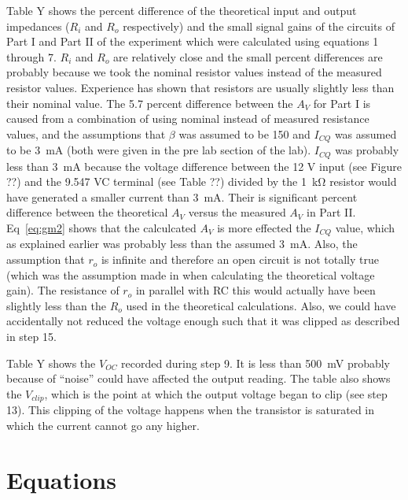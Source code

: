 Table Y shows the percent difference of the theoretical input and output impedances ($R_i$ and $R_o$ respectively) and the small signal gains of the circuits of Part I and Part II of the experiment which were calculated using equations 1 through 7. $R_i$ and $R_o$ are relatively close and the small percent differences are probably because we took the nominal resistor values instead of the measured resistor values. Experience has shown that resistors are usually slightly less than their nominal value. The 5.7 percent difference between the $A_V$ for Part I is caused from a combination of using nominal instead of measured resistance values, and the assumptions that $\beta$ was assumed to be 150 and  $I_{CQ}$ was assumed to be \SI{3}{mA} (both were given in the pre lab section of the lab). $I_{CQ}$ was probably less than \SI{3}{mA} because the voltage difference between the 12 V input (see Figure ??) and the 9.547 VC terminal (see Table ??) divided by the \SI{1}{\kilo\ohm} resistor would have generated a smaller current than \SI{3}{mA}. Their is significant percent difference between the theoretical $A_V$ versus the measured $A_V$ in Part II. Eq~\ref{eq:gm2} shows that the calculcated $A_V$ is more effected the $I_{CQ}$ value, which as explained earlier was probably less than the assumed \SI{3}{mA}. Also, the assumption that $r_o$ is infinite and therefore an open circuit is not totally true (which was the assumption made in when calculating the theoretical voltage gain). The resistance of $r_o$ in parallel with RC this would actually have been slightly less than the $R_o$ used in the theoretical calculations. Also, we could have accidentally not reduced the voltage enough such that it was clipped as described in step 15.

Table Y shows the $V_{OC}$ recorded during step 9. It is less than \SI{500}{mV} probably because of “noise” could have affected the output reading. The table also shows the $V_{clip}$, which is the point at which the output voltage began to clip (see step 13). This clipping of the voltage happens when the transistor is saturated in which the current cannot go any higher.

\section{Equations}

